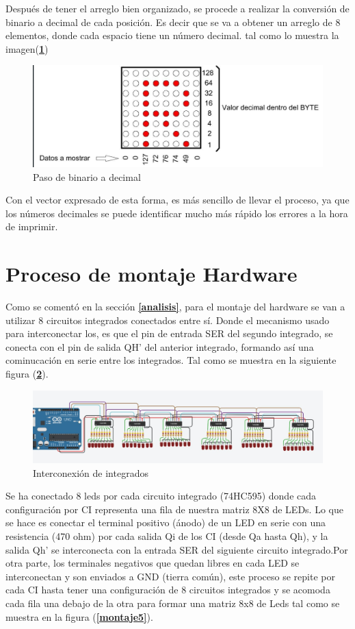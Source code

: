 \documentclass{article}
\begin{document}
Después de tener el arreglo bien organizado, se procede a realizar la conversión de binario a decimal de cada posición. Es decir que se va a obtener un arreglo de 8 elementos, donde cada espacio tiene un número decimal. tal como lo muestra la imagen(\textbf{\ref{decbin}})

    \begin{figure}[h]
    \includegraphics[width=12cm]{decbin.png}
    \centering
    \caption{Paso de binario a decimal}
    \label{decbin}
    \end{figure}
    
Con el vector expresado de esta forma, es más sencillo de llevar el proceso, ya que los números decimales se puede identificar mucho más rápido los errores a la hora de imprimir.

\section{Proceso de montaje Hardware}\label{montaje}
Como se comentó en la sección \textbf{\ref{analisis}}, para el montaje del hardware se van a utilizar 8 circuitos integrados conectados entre sí. Donde el mecanismo usado para interconectar los, es que el pin de entrada SER del segundo integrado, se conecta con el pin de  salida  QH' del anterior integrado, formando así una cominucación en serie entre los integrados. Tal como se muestra en la siguiente figura (\textbf{\ref{inter}}).

    \begin{figure}[h]
    \includegraphics[width=14cm]{inter.jpeg}
    \centering
    \caption{Interconexión de integrados}
    \label{inter}
    \end{figure}

Se ha conectado 8 leds por cada circuito integrado (74HC595) donde cada configuración por CI representa una fila de nuestra matriz 8X8 de LEDs. 
Lo que se hace es conectar el terminal positivo (ánodo) de un LED en serie con una resistencia (470 ohm) por cada salida Qi de los CI (desde Qa hasta Qh),  y la salida Qh’ se interconecta con la entrada SER del siguiente circuito integrado.Por otra parte, los terminales negativos que quedan libres en cada LED se interconectan y son enviados a GND (tierra común), este proceso se repite por cada CI  hasta tener una configuración de 8 circuitos integrados y se acomoda cada fila una debajo de la otra para formar una matriz 8x8 de Leds tal como se muestra en la figura (\textbf{\ref{montaje5}}).
\end{document}
